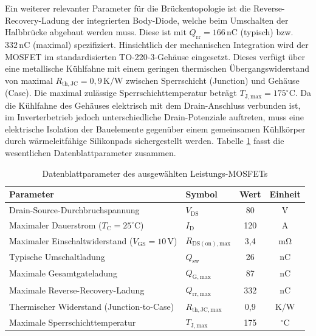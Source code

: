 Ein weiterer relevanter Parameter für die Brückentopologie ist die Reverse-Recovery-Ladung der integrierten Body-Diode, welche beim Umschalten der Halbbrücke abgebaut werden muss. Diese ist mit $Q_{\mathrm{rr}} = 166\,\mathrm{nC}$ (typisch) bzw. $332\,\mathrm{nC}$ (maximal) spezifiziert.
Hinsichtlich der mechanischen Integration wird der MOSFET im standardisierten TO-220-3-Gehäuse eingesetzt. Dieses verfügt über eine metallische Kühlfahne mit einem geringen thermischen Übergangswiderstand von maximal $R_{\mathrm{th,JC}} = 0{,}9\,\mathrm{K/W}$ zwischen Sperrschicht (Junction) und Gehäuse (Case). Die maximal zulässige Sperrschichttemperatur beträgt $T_{\mathrm{J,max}} = 175^\circ\mathrm{C}$. 
Da die Kühlfahne des Gehäuses elektrisch mit dem Drain-Anschluss verbunden ist, im Inverterbetrieb jedoch unterschiedliche Drain-Potenziale auftreten, muss eine elektrische Isolation der Bauelemente gegenüber einem gemeinsamen Kühlkörper durch wärmeleitfähige Silikonpads sichergestellt werden.
Tabelle \ref{tab:mosfet_specs} fasst die wesentlichen Datenblattparameter zusammen.

\begin{table}[htbp]
\centering
\caption{Datenblattparameter des ausgewählten Leistungs-MOSFETs \cite{DS_IPP034N08N5}}
\label{tab:mosfet_specs}
\begin{tabular}{llcc}
\toprule
\textbf{Parameter} & \textbf{Symbol} & \textbf{Wert} & \textbf{Einheit} \\
\midrule
Drain-Source-Durchbruchspannung & $V_{\mathrm{DS}}$ & 80 & $\mathrm{V}$ \\
Maximaler Dauerstrom ($T_{\mathrm{C}}=25^\circ\mathrm{C}$) & $I_{\mathrm{D}}$ & 120 & $\mathrm{A}$ \\
Maximaler Einschaltwiderstand ($V_{\mathrm{GS}}=10\,\mathrm{V}$) & $R_{\mathrm{DS(on),max}}$ & 3{,}4 & $\mathrm{m\Omega}$ \\
Typische Umschaltladung & $Q_{\mathrm{sw}}$ & 26 & $\mathrm{nC}$ \\
Maximale Gesamtgateladung & $Q_{\mathrm{G,max}}$ & 87 & $\mathrm{nC}$ \\
Maximale Reverse-Recovery-Ladung & $Q_{\mathrm{rr,max}}$ & 332 & $\mathrm{nC}$ \\
Thermischer Widerstand (Junction-to-Case) & $R_{\mathrm{th,JC,max}}$ & 0{,}9 & $\mathrm{K/W}$ \\
Maximale Sperrschichttemperatur & $T_{\mathrm{J,max}}$ & 175 & $^\circ\mathrm{C}$ \\
\bottomrule
\end{tabular}
\end{table}


